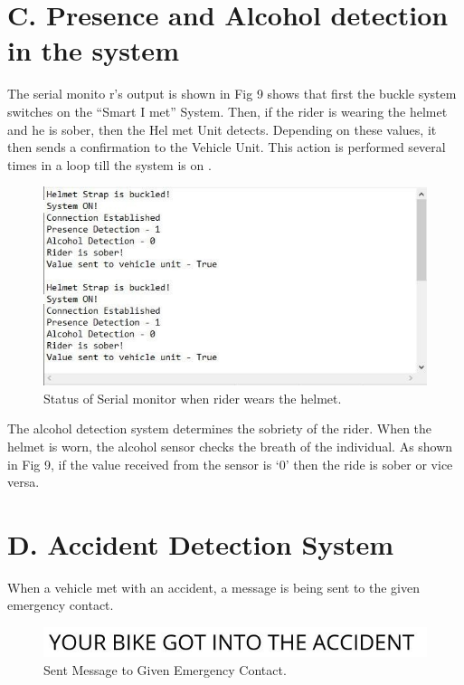 \pagebreak
\section*{C. Presence and Alcohol detection in the system }
The serial monito r’s output is shown in Fig 9 shows that first the buckle system switches on the “Smart I met” System. Then, if the rider is wearing the helmet and he is sober, then the Hel met Unit detects. Depending on these values, it then sends a confirmation to the Vehicle Unit. This  action is performed several times in a loop till the system is on  .

\begin{figure}[h]
	\centering
	\includegraphics[width=0.7\linewidth]{"images/Status of rider"}
	\captionsetup{labelformat=empty}
	\caption[]{Status of Serial monitor when rider wears the helmet.}
	\label{fig:status-of-rider}
\end{figure}


The alcohol detection system determines the sobriety of the rider. When the helmet is worn, the alcohol sensor checks the breath of the individual.  As  shown  in  Fig 9,  if the value received from the sensor is ‘0’ then the ride is sober or vice versa.

\section*{D. Accident Detection System}
When a vehicle met with an accident, a message is being sent to the given emergency contact.
\begin{figure}
	\centering
	\includegraphics[width=0.7\linewidth]{"images/fas sa"}
	\captionsetup{labelformat=empty}
	\caption[]{Sent Message to Given Emergency Contact.}
	\label{fig:fas-sa}
\end{figure}



